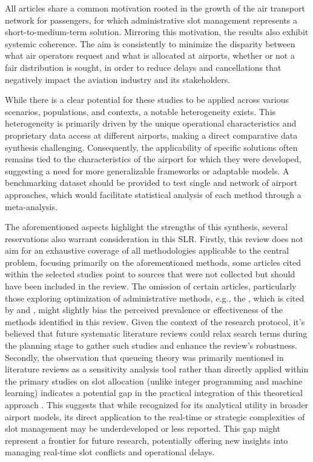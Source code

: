 All articles share a common motivation rooted in the growth of the air transport network for passengers, for which administrative slot management represents a short-to-medium-term solution. Mirroring this motivation, the results also exhibit systemic coherence. The aim is consistently to minimize the disparity between what air operators request and what is allocated at airports, whether or not a fair distribution is sought, in order to reduce delays and cancellations that negatively impact the aviation industry and its stakeholders.

While there is a clear potential for these studies to be applied across various scenarios, populations, and contexts, a notable heterogeneity exists. This heterogeneity is primarily driven by the unique operational characteristics and proprietary data access at different airports, making a direct comparative data synthesis challenging. Consequently, the applicability of specific solutions often remains tied to the characteristics of the airport for which they were developed, suggesting a need for more generalizable frameworks or adaptable models. A benchmarking dataset should be provided to test single and network of airport approaches, which would facilitate statistical analysis of each method through a meta-analysis.  

The aforementioned aspects highlight the strengths of this synthesis, several reservations also warrant consideration in this \acrshort{SLR}. Firstly, this review does not aim for an exhaustive coverage of all methodologies applicable to the central problem, focusing primarily on the aforementioned methods, some articles cited within the selected studies point to sources that were not collected but should have been included in the review. The omission of certain articles, particularly those exploring optimization of administrative methods, e.g., the , which is cited by  and , might slightly bias the perceived prevalence or effectiveness of the methods identified in this review. Given the context of the research protocol, it's believed that future systematic literature reviews could relax search terms during the planning stage to gather such studies and enhance the review's robustness. Secondly, the observation that queueing theory was primarily mentioned in literature reviews as a sensitivity analysis tool rather than directly applied within the primary studies on slot allocation (unlike integer programming and machine learning) indicates a potential gap in the practical integration of this theoretical approach \cite{gillen2016airport}. This suggests that while recognized for its analytical utility in broader airport models, its direct application to the real-time or strategic complexities of slot management may be underdeveloped or less reported. This gap might represent a frontier for future research, potentially offering new insights into managing real-time slot conflicts and operational delays. 


